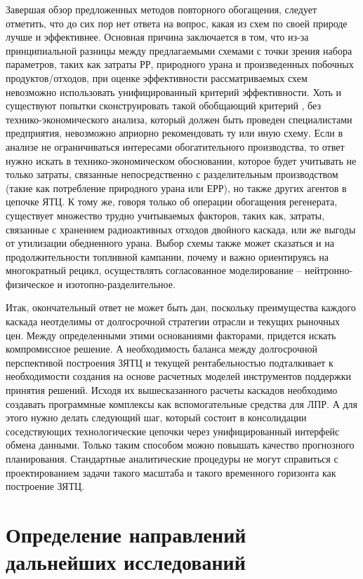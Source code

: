 Завершая обзор предложенных методов повторного обогащения, следует отметить, что до сих пор нет ответа на вопрос, какая из схем по своей природе лучше и эффективнее.
Основная причина заключается в том, что из-за принципиальной разницы между предлагаемыми схемами с точки зрения набора параметров, таких как затраты РР, природного урана и произведенных побочных продуктов/отходов, при оценке эффективности рассматриваемых схем невозможно использовать унифицированный критерий эффективности.
Хоть и существуют попытки сконструировать такой обобщающий критерий \cite{rodionovaAnalizTehnikoekonomicheskihHarakteristik2019a}, без технико-экономического анализа, который должен быть проведен специалистами предприятия, невозможно априорно рекомендовать ту или иную схему.
Если в анализе не ограничиваться интересами обогатительного производства, то ответ нужно искать в технико-экономическом обосновании, которое будет учитывать не только затраты, связанные непосредственно с разделительным производством (такие как потребление природного урана или ЕРР), но также других агентов в цепочке ЯТЦ.
К тому же, говоря только об операции обогащения регенерата, существует множество трудно учитываемых факторов, таких как, затраты, связанные с хранением радиоактивных отходов двойного каскада, или же выгоды от утилизации обедненного урана.
Выбор схемы также может сказаться и на продолжительности топливной кампании, почему и важно ориентируясь на многократный рецикл, осуществлять согласованное моделирование -- нейтронно-физическое и изотопно-разделительное.

Итак, окончательный ответ не может быть дан, поскольку преимущества каждого каскада неотделимы от долгосрочной стратегии отрасли и текущих рыночных цен.
Между определенными этими основаниями факторами, придется искать компромиссное решение.
А необходимость баланса между долгосрочной перспективой построения ЗЯТЦ и текущей рентабельностью подталкивает к необходимости создания на основе расчетных моделей инструментов поддержки принятия решений.
Исходя их вышесказанного расчеты каскадов необходимо создавать программные комплексы как вспомогательные средства для ЛПР.
А для этого нужно делать следующий шаг, который состоит в консолидации соседствующих технологические цепочки через унифицированный интерфейс обмена данными.
Только таким способом можно повышать качество прогнозного планирования.
Стандартные аналитические процедуры не могут справиться с проектированием задачи такого масштаба и такого временного горизонта как построение ЗЯТЦ. 

\section{Определение направлений дальнейших исследований}

